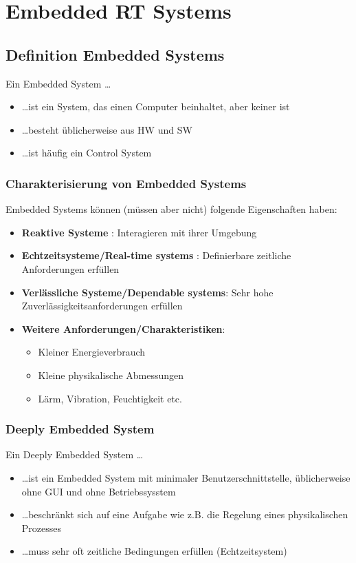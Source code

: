 \section{Embedded RT Systems}
\subsection{Definition Embedded Systems}
Ein Embedded System \ldots
\begin{itemize}
  \item \ldots ist ein System, das einen Computer beinhaltet, aber keiner ist
  \item \ldots besteht üblicherweise aus HW und SW
  \item \ldots ist häufig ein Control System
\end{itemize}
\subsubsection{Charakterisierung von Embedded Systems}
Embedded Systems können (müssen aber nicht) folgende Eigenschaften haben:
  \begin{itemize}
    \item \textbf{Reaktive Systeme} : Interagieren mit ihrer Umgebung
    \item \textbf{Echtzeitsysteme/Real-time systems} : Definierbare zeitliche
    Anforderungen erfüllen
    \item \textbf{Verlässliche Systeme/Dependable systems}: Sehr hohe
    Zuverlässigkeitsanforderungen erfüllen
    \item \textbf{Weitere Anforderungen/Charakteristiken}:
    \begin{itemize}
      \item Kleiner Energieverbrauch
      \item Kleine physikalische Abmessungen
      \item Lärm, Vibration, Feuchtigkeit etc.
    \end{itemize}
  \end{itemize}

\subsubsection{Deeply Embedded System}
Ein Deeply Embedded System \ldots
\begin{itemize}
  \item \ldots ist ein Embedded System mit minimaler Benutzerschnittstelle, üblicherweise ohne GUI und ohne Betriebssysstem
  \item \ldots beschränkt sich auf eine Aufgabe wie z.B. die Regelung eines physikalischen Prozesses
  \item \ldots muss sehr oft zeitliche Bedingungen erfüllen (Echtzeitsystem)
\end{itemize}

